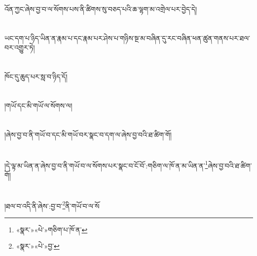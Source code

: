 འོན་ཀྱང་ཞེས་བྱ་བ་ལ་སོགས་པས་ནི་ཚིགས་སུ་བཅད་པའི་ཆ་ལྷག་མ་འགྲེལ་པར་བྱེད་དེ།\chapter{ }ཡང་དག་པ་ཉིད་ཡིན་ན་རྣམ་པ་དང་རྣམ་པར་ཤེས་པ་གཉིས་སྔ་མ་བཞིན་དུ་རང་བཞིན་ཕན་ཚུན་གནས་པར་ཐལ་བར་འགྱུར་ཏེ།\chapter{ }ཁོང་དུ་ཆུད་པར་སླ་བ་ཉིད་དོ།\chapter{ }།གཡོ་དང་མི་གཡོ་ལ་སོགས་ལ།\chapter{ }།ཞེས་བྱ་བ་ནི་གཡོ་བ་དང་མི་གཡོ་བར་སྣང་བ་དག་ལ་ཞེས་བྱ་བའི་ཐ་ཚིག་གོ།\chapter{ }།དེ་ལྟ་མ་ཡིན་ན་ཞེས་བྱ་བ་ནི་གཡོ་བ་ལ་སོགས་པར་སྣང་བ་ངོ་བོ་:གཅིག་ལ་ཁོ་ན་མ་ཡིན་ན་\footnote{«སྣར་»«པེ་»གཅིག་པ་ཁོ་ན་}ཞེས་བྱ་བའི་ཐ་ཚིག་གོ།\chapter{ }།ཐལ་བ་འདི་ནི་ཞེས་:བྱ་བ་\footnote{«སྣར་»«པེ་»བྱ་}ནི་གཡོ་བ་ལ་སོ